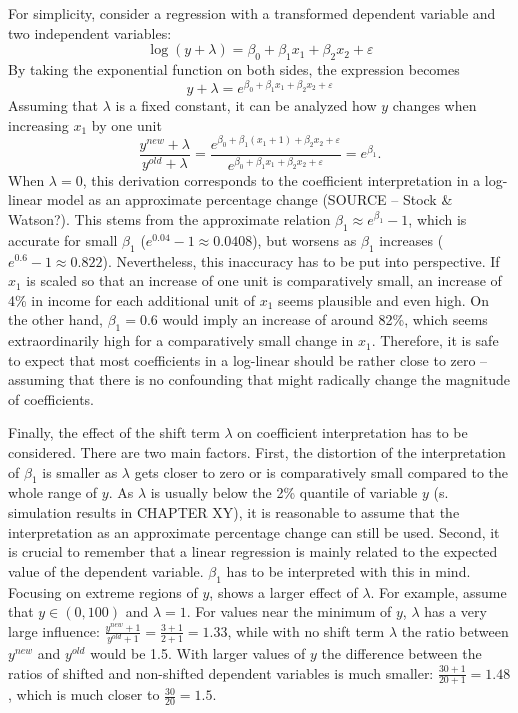 For simplicity, consider a regression with a transformed dependent variable and two independent variables:
\begin{equation*}
    \log(y + \lambda) = \beta_0 + \beta_1 x_1 + \beta_2 x_2 + \varepsilon
\end{equation*}
By taking the exponential function on both sides, the expression becomes
\begin{equation*}
    y + \lambda = e^{\beta_0 + \beta_1 x_1 + \beta_2 x_2 + \varepsilon}
\end{equation*}
Assuming that $\lambda$ is a fixed constant, it can be analyzed how $y$ changes when increasing $x_1$ by one unit
\begin{equation}
    \displaystyle \frac{y^{new} + \lambda}{y^{old} + \lambda} =
        \frac{e^{\beta_0 + \beta_1 (x_1 + 1) + \beta_2 x_2 + \varepsilon}}
             {e^{\beta_0 + \beta_1 x_1 + \beta_2 x_2 + \varepsilon}} = e^{\beta_1}.
\end{equation}
When $\lambda = 0$, this derivation corresponds to the coefficient interpretation in a log-linear model as an approximate percentage change (SOURCE – Stock \& Watson?).
This stems from the approximate relation $\beta_1 \approx e^{\beta_1} - 1$, which is accurate for small $\beta_1$ ($e^{0.04} - 1 \approx 0.0408$), but worsens as $\beta_1$ increases ($e^{0.6} - 1 \approx 0.822$).
Nevertheless, this inaccuracy has to be put into perspective.
If $x_1$ is scaled so that an increase of one unit is comparatively small, an increase of 4\% in income for each additional unit of $x_1$ seems plausible and even high.
On the other hand, $\beta_1 = 0.6$ would imply an increase of around 82\%, which seems extraordinarily high for a comparatively small change in $x_1$.
Therefore, it is safe to expect that most coefficients in a log-linear should be rather close to zero – assuming that there is no confounding that might radically change the magnitude of coefficients.

Finally, the effect of the shift term $\lambda$ on coefficient interpretation has to be considered.
There are two main factors.
First, the distortion of the interpretation of $\beta_1$ is smaller as $\lambda$ gets closer to zero or is comparatively small compared to the whole range of $y$.
As $\lambda$ is usually below the 2\% quantile of variable $y$ (s. simulation results in CHAPTER XY), it is reasonable to assume that the interpretation as an approximate percentage change can still be used.
Second, it is crucial to remember that a linear regression is mainly related to the expected value of the dependent variable.
$\beta_1$ has to be interpreted with this in mind.
Focusing on extreme regions of $y$, shows a larger effect of $\lambda$.
For example, assume that $y \in (0, 100)$ and $\lambda = 1$.
For values near the minimum of $y$, $\lambda$ has a very large influence: $\frac{y^{new} + 1 } {y^{old} + 1} = \frac{3 + 1}  {2 + 1} = 1.33$, while with no shift term $\lambda$ the ratio between $y^{new}$ and $y^{old}$ would be 1.5. With larger values of $y$ the difference between the ratios of shifted and non-shifted dependent variables is much smaller: $\frac{30 + 1}{20 + 1} = 1.48$, which is much closer to $\frac{30}{20} = 1.5$.

